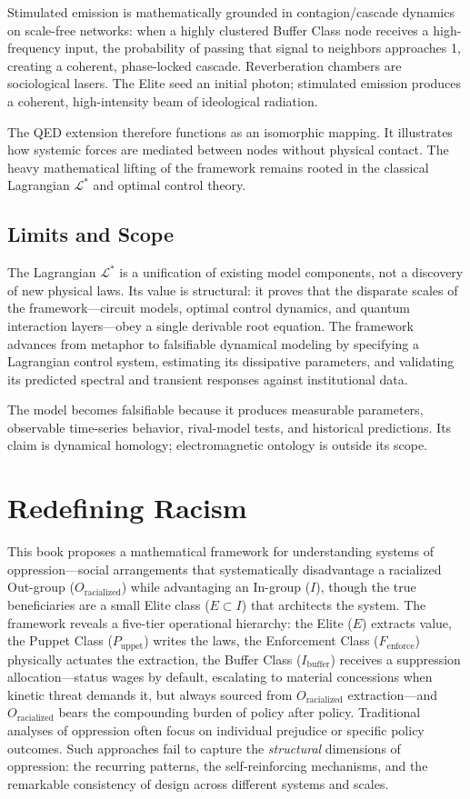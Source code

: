 Stimulated emission is mathematically grounded in contagion/cascade dynamics on scale-free networks: when a highly clustered Buffer Class node receives a high-frequency input, the probability of passing that signal to neighbors approaches 1, creating a coherent, phase-locked cascade. Reverberation chambers are sociological lasers. The Elite seed an initial photon; stimulated emission produces a coherent, high-intensity beam of ideological radiation.

The QED extension therefore functions as an isomorphic mapping. It illustrates how systemic forces are mediated between nodes without physical contact. The heavy mathematical lifting of the framework remains rooted in the classical Lagrangian $\mathcal{L}^*$ and optimal control theory.

\section{Limits and Scope}

The Lagrangian $\mathcal{L}^*$ is a unification of existing model components, not a discovery of new physical laws. Its value is structural: it proves that the disparate scales of the framework---circuit models, optimal control dynamics, and quantum interaction layers---obey a single derivable root equation. The framework advances from metaphor to falsifiable dynamical modeling by specifying a Lagrangian control system, estimating its dissipative parameters, and validating its predicted spectral and transient responses against institutional data.

The model becomes falsifiable because it produces measurable parameters, observable time-series behavior, rival-model tests, and historical predictions. Its claim is dynamical homology; electromagnetic ontology is outside its scope.

\chapter{Redefining Racism}
\label{ch:redefining}

This book proposes a mathematical framework for understanding systems of oppression---social arrangements that systematically disadvantage a racialized Out-group ($O_{\text{racialized}}$) while advantaging an In-group ($I$), though the true beneficiaries are a small Elite class ($E \subset I$) that architects the system. The framework reveals a five-tier operational hierarchy: the Elite ($E$) extracts value, the Puppet Class ($P_{\text{uppet}}$) writes the laws, the Enforcement Class ($F_{\text{enforce}}$) physically actuates the extraction, the Buffer Class ($I_{\text{buffer}}$) receives a suppression allocation---status wages by default, escalating to material concessions when kinetic threat demands it, but always sourced from $O_{\text{racialized}}$ extraction---and $O_{\text{racialized}}$ bears the compounding burden of policy after policy. Traditional analyses of oppression often focus on individual prejudice or specific policy outcomes. Such approaches fail to capture the \textit{structural} dimensions of oppression: the recurring patterns, the self-reinforcing mechanisms, and the remarkable consistency of design across different systems and scales.

